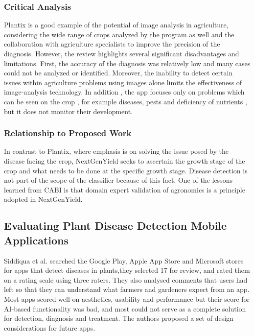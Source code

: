 \documentclass{FastFyp}
\begin{document}
\subsubsection{Critical Analysis}
Plantix is a good example of the potential of image analysis in agriculture, considering the wide range of crops analyzed by the program as well and the collaboration with agriculture specialists to improve the precision of the diagnosis. However, the review highlights several significant disadvantages and limitations. First, the accuracy of the diagnosis was relatively low and many cases could not be analyzed or identified. Moreover, the inability to detect certain issues within agriculture problems using images alone limits the effectiveness of image-analysis technology. In addition , the app focuses only on problems which can be seen on the crop , for example diseases, pests and deficiency of nutrients , but it does not monitor their development. 

\subsubsection{Relationship to Proposed Work}
In contrast to Plantix, where emphasis is on solving the issue posed by the disease facing the crop, NextGenYield seeks to ascertain the growth stage of the crop and what needs to be done at the specific growth stage. Disease detection is not part of the scope of the classifier because of this fact. One of the lessons learned from CABI is that domain expert validation of agronomics is a principle adopted in NextGenYield. 


\subsection{Evaluating Plant Disease Detection Mobile Applications}

Siddiqua et al. \cite{ref:Siddiqua:2022} searched the Google Play, Apple App Store and Microsoft stores for apps that detect diseases in plants,they selected 17 for review, and rated them on a rating scale using three raters. They also analysed comments that users had left so that they can understand what farmers and gardeners expect from an app. Most apps scored well on aesthetics, usability and performance but their score for AI-based functionality was bad, and most could not serve as a complete solution for detection, diagnosis and treatment. The authors proposed a set of design considerations for future apps.
\end{document}
